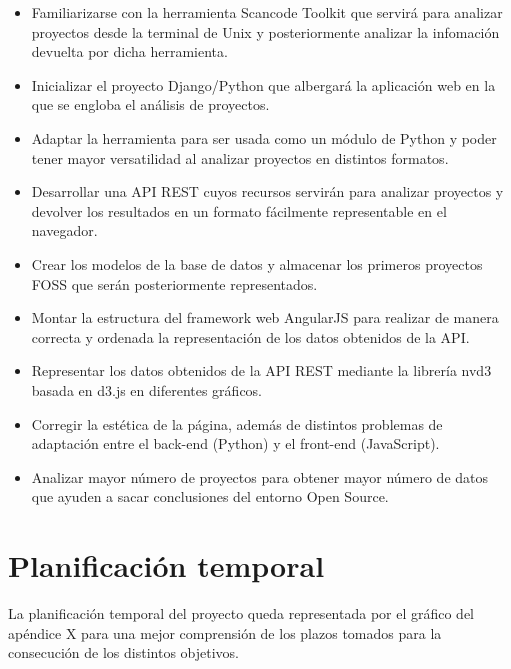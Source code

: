 \documentclass[a4paper, spanish, 12pt]{book}
\begin{document}
\begin{itemize}

\item Familiarizarse con la herramienta Scancode Toolkit que servir\'a para
analizar proyectos desde la terminal de Unix y posteriormente analizar la
infomaci\'on devuelta por dicha herramienta.

\item Inicializar el proyecto Django/Python que albergar\'a la aplicaci\'on
web en la que se engloba el an\'alisis de proyectos.

\item Adaptar la herramienta para ser usada como un m\'odulo de Python
y poder tener mayor versatilidad al analizar proyectos en distintos formatos.

\item Desarrollar una API REST cuyos recursos servir\'an para analizar proyectos
y devolver los resultados en un formato f\'acilmente representable en el navegador.

\item Crear los modelos de la base de datos y almacenar los
primeros proyectos FOSS que ser\'an posteriormente representados.

\item Montar la estructura del framework web AngularJS para realizar de manera
correcta y ordenada la representaci\'on de los datos obtenidos de la API.

\item Representar los datos obtenidos de la API REST mediante la librer\'ia
nvd3 basada en d3.js en diferentes gr\'aficos.

\item Corregir la est\'etica de la p\'agina, adem\'as de distintos problemas de
adaptaci\'on entre el back-end (Python) y el front-end (JavaScript).

\item Analizar mayor n\'umero de proyectos para obtener mayor n\'umero de datos
que ayuden a sacar conclusiones del entorno Open Source.

\end{itemize}

\section{Planificaci\'on temporal}
\label{sec:planificacion-temporal}

La planificaci\'on temporal del proyecto queda representada por el gr\'afico del
ap\'endice X para una mejor comprensi\'on de los plazos tomados para la consecuci\'on
de los distintos objetivos.
\end{document}
